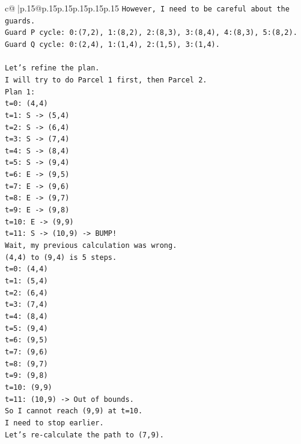 \documentclass{article}
\begin{document}
{\begin{supertabular}{c@{$\;$}|p{.15\linewidth}@{}p{.15\linewidth}p{.15\linewidth}p{.15\linewidth}p{.15\linewidth}p{.15\linewidth}}
{{{\texttt{However, I need to be careful about the guards.} \\
\texttt{Guard P cycle: 0:(7,2), 1:(8,2), 2:(8,3), 3:(8,4), 4:(8,3), 5:(8,2).} \\
\texttt{Guard Q cycle: 0:(2,4), 1:(1,4), 2:(1,5), 3:(1,4).} \\
\\ 
\texttt{Let's refine the plan.} \\
\texttt{I will try to do Parcel 1 first, then Parcel 2.} \\
\texttt{Plan 1:} \\
\texttt{t=0: (4,4)} \\
\texttt{t=1: S {-}> (5,4)} \\
\texttt{t=2: S {-}> (6,4)} \\
\texttt{t=3: S {-}> (7,4)} \\
\texttt{t=4: S {-}> (8,4)} \\
\texttt{t=5: S {-}> (9,4)} \\
\texttt{t=6: E {-}> (9,5)} \\
\texttt{t=7: E {-}> (9,6)} \\
\texttt{t=8: E {-}> (9,7)} \\
\texttt{t=9: E {-}> (9,8)} \\
\texttt{t=10: E {-}> (9,9)} \\
\texttt{t=11: S {-}> (10,9) {-}> BUMP!} \\
\texttt{Wait, my previous calculation was wrong.} \\
\texttt{(4,4) to (9,4) is 5 steps.} \\
\texttt{t=0: (4,4)} \\
\texttt{t=1: (5,4)} \\
\texttt{t=2: (6,4)} \\
\texttt{t=3: (7,4)} \\
\texttt{t=4: (8,4)} \\
\texttt{t=5: (9,4)} \\
\texttt{t=6: (9,5)} \\
\texttt{t=7: (9,6)} \\
\texttt{t=8: (9,7)} \\
\texttt{t=9: (9,8)} \\
\texttt{t=10: (9,9)} \\
\texttt{t=11: (10,9) {-}> Out of bounds.} \\
\texttt{So I cannot reach (9,9) at t=10.} \\
\texttt{I need to stop earlier.} \\
\texttt{Let's re{-}calculate the path to (7,9).} \\
}}}
\end{supertabular}}
\end{document}
